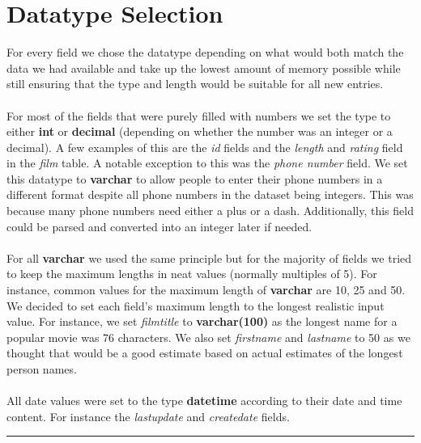 \documentclass{article}
\begin{document}
\section{Datatype Selection}
	For every field we chose the datatype depending on what would both match the data we had available and take up the lowest amount of memory possible 
	while still ensuring that the type and length would be suitable for all new entries. 
	\\\\
	For most of the fields that were purely filled with numbers we set the type to either \textbf{int} or \textbf{decimal} (depending on whether the number was an integer 
	or a decimal). A few examples of this are the \emph{id} fields and the \emph{length} and \emph{rating} field in the \emph{film} table. A notable exception to this was the 
	\emph{phone number} field. We set this datatype to \textbf{varchar} to allow people to enter their phone numbers in a different format despite all phone numbers in the 
	dataset being integers. This was because many phone numbers need either a plus or a dash. Additionally, this field could be parsed and converted into an integer later if needed.
	\\\\	
	For all \textbf{varchar} we used the same principle but for the majority of fields we tried to keep the maximum lengths in neat values (normally multiples of 5). For instance, common 
	values for the maximum length of \textbf{varchar} are 10, 25 and 50. We decided to set each field’s maximum length to the longest realistic input value.
	For instance, we set \emph{film\textunderscore title} to \textbf{varchar(100)} as the longest name for a popular movie was 76 characters. We also set \emph{first\textunderscore name} and 
	\emph{last\textunderscore name} to 50 as we thought that would be a good estimate based on actual estimates of the longest person names.
	\\\\
	All date values were set to the type \textbf{datetime} according to their date and time content. For instance the \emph{last\textunderscore update} and
	\emph{create\textunderscore date} fields.	
	\\
	\rule{\textwidth}{0.4pt}
	
\end{document}
